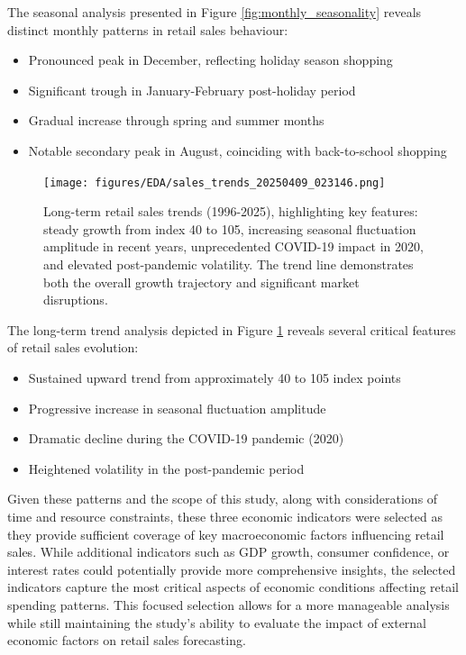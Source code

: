\documentclass[12pt,a4paper]{report}
\begin{document}
The seasonal analysis presented in Figure \ref{fig:monthly_seasonality} reveals distinct monthly patterns in retail sales behaviour:
\begin{itemize}
    \item Pronounced peak in December, reflecting holiday season shopping
    \item Significant trough in January-February post-holiday period
    \item Gradual increase through spring and summer months
    \item Notable secondary peak in August, coinciding with back-to-school shopping
\end{itemize}

\begin{figure}[htbp]
\centering
\texttt{[image: figures/EDA/sales\_trends\_20250409\_023146.png]}
\caption{Long-term retail sales trends (1996-2025), highlighting key features: steady growth from index 40 to 105, increasing seasonal fluctuation amplitude in recent years, unprecedented COVID-19 impact in 2020, and elevated post-pandemic volatility. The trend line demonstrates both the overall growth trajectory and significant market disruptions.}
\label{fig:sales_trends}
\end{figure}

The long-term trend analysis depicted in Figure \ref{fig:sales_trends} reveals several critical features of retail sales evolution:
\begin{itemize}
    \item Sustained upward trend from approximately 40 to 105 index points
    \item Progressive increase in seasonal fluctuation amplitude
    \item Dramatic decline during the COVID-19 pandemic (2020)
    \item Heightened volatility in the post-pandemic period
\end{itemize}

Given these patterns and the scope of this study, along with considerations of time and resource constraints, these three economic indicators were selected as they provide sufficient coverage of key macroeconomic factors influencing retail sales. While additional indicators such as GDP growth, consumer confidence, or interest rates could potentially provide more comprehensive insights, the selected indicators capture the most critical aspects of economic conditions affecting retail spending patterns. This focused selection allows for a more manageable analysis while still maintaining the study's ability to evaluate the impact of external economic factors on retail sales forecasting.
\end{document}

